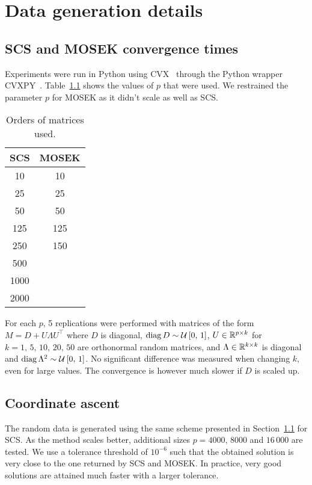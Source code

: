 \chapter{Data generation details}\label{ch:appendix_data}

\section{SCS and MOSEK convergence times}\label{sec:cvx_times}

Experiments were run in Python using CVX~\citep{cvx} through the Python wrapper CVXPY~\citep{cvxpy}.
Table~\ref{tab:cvx_times_ps} shows the values of $p$ that were used.
We restrained the parameter $p$ for MOSEK as it didn't scale as well as SCS\@.
\begin{table}[!htb]
    \centering
    \setlength{\tabcolsep}{2pt}
    {\small
        \begin{tabular}{|c|c|}\hline
        \textbf{SCS} & \textbf{MOSEK}\\ \hline
        10 & 10\\ \hline
        25 & 25\\ \hline
        50 & 50\\ \hline
        125 & 125\\ \hline
        250 & 150\\ \hline
        500 &\\ \hline
        1000 &\\ \hline
        2000 &\\ \hline
        \end{tabular}
    }%
    \caption[short]{
        Orders of matrices used.
    }
    \label{tab:cvx_times_ps}
\end{table}
For each $p$, 5 replications were performed with matrices of the form $M = D + U \Lambda U^\top$ where $D$ is diagonal,
$\operatorname*{diag} D \sim \mathcal{U}\left[ 0,\, 1 \right]$, $U \in \mathbb{R}^{p \times k}$ for $k = 1,\, 5,\, 10,\, 20,\, 50$
are orthonormal random matrices, and $\Lambda \in \mathbb{R}^{k \times k}$ is diagonal and
$\operatorname*{diag} \Lambda^2 \sim \mathcal{U}\left[ 0,\, 1 \right]$.
No significant difference was measured when changing $k$, even for large values.
The convergence is however much slower if $D$ is scaled up.

\section{Coordinate ascent}\label{sec:coordinate_ascent_data}

The random data is generated using the same scheme presented in Section~\ref{sec:cvx_times} for SCS\@.
As the method scales better, additional sizes $p = 4000,\, 8000$ and $16\,000$ are tested.
We use a tolerance threshold of $10^{-6}$
such that the obtained solution is very close to the one returned by SCS and MOSEK\@.
In practice, very good solutions are attained much faster with a larger tolerance.

